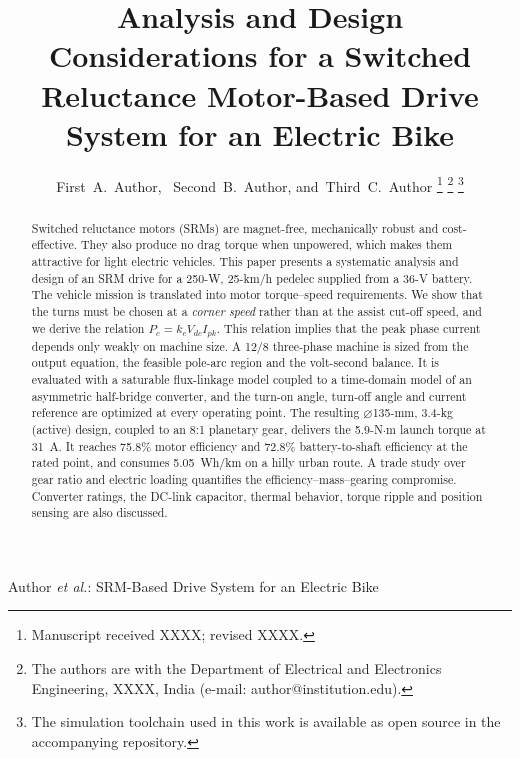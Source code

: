 \documentclass[journal]{IEEEtran}
\begin{document}
\title{Analysis and Design Considerations for a Switched Reluctance Motor-Based Drive System for an Electric Bike}

\author{First~A.~Author,~
        Second~B.~Author,
        and~Third~C.~Author%
\thanks{Manuscript received XXXX; revised XXXX.}%
\thanks{The authors are with the Department of Electrical and Electronics Engineering, XXXX, India (e-mail: author@institution.edu).}%
\thanks{The simulation toolchain used in this work is available as open source in the accompanying repository.}}

%
{Author \MakeLowercase{\textit{et al.}}: SRM-Based Drive System for an Electric Bike}

\maketitle

\begin{abstract}
Switched reluctance motors (SRMs) are magnet-free, mechanically robust and
cost-effective. They also produce no drag torque when unpowered, which makes
them attractive for light electric vehicles. This paper presents a systematic
analysis and design of an SRM drive for a \mbox{250-W}, 25-km/h pedelec supplied
from a 36-V battery. The vehicle mission is translated into motor
torque--speed requirements. We show that the turns must be chosen at a
\emph{corner speed} rather than at the assist cut-off speed, and we derive the
relation $P_c = k_c V_{dc} I_{pk}$. This relation implies that the peak phase
current depends only weakly on machine size. A 12/8 three-phase machine
is sized from the output equation, the feasible pole-arc region and the
volt-second balance. It is evaluated with a saturable flux-linkage model coupled
to a time-domain model of an asymmetric half-bridge converter, and the
turn-on angle, turn-off angle and current reference are optimized at every
operating point. The resulting $\varnothing$135-mm, 3.4-kg (active) design,
coupled to an 8:1 planetary gear, delivers the 5.9-N$\cdot$m launch torque at
31~A. It reaches 75.8\% motor efficiency and 72.8\% battery-to-shaft efficiency
at the rated point, and consumes 5.05~Wh/km on a hilly urban route. A trade
study over gear ratio and electric loading quantifies the
efficiency--mass--gearing compromise. Converter ratings, the DC-link
capacitor, thermal behavior, torque ripple and position sensing are also discussed.
\end{abstract}
\end{document}

